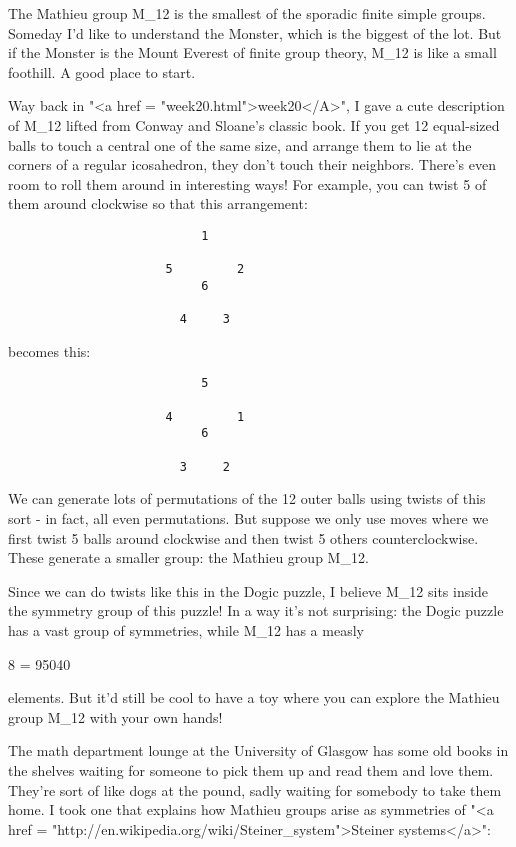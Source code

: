 The Mathieu group M_{12} is the smallest of the sporadic finite simple
groups.  Someday I'd like to understand the Monster, which is the 
biggest of the lot.  But if the Monster is the Mount Everest of finite 
group theory, M_{12} is like a small foothill.  A good place to start.

Way back in "<a href = "week20.html">week20</A>", I gave a
cute description of M_{12} lifted from Conway and Sloane's
classic book.  If you get 12 equal-sized balls to touch a central one
of the same size, and arrange them to lie at the corners of a regular
icosahedron, they don't touch their neighbors.  There's even room to
roll them around in interesting ways!  For example, you can twist 5 of
them around clockwise so that this arrangement:

\begin{verbatim}
                           1
 
                      5         2
                           6
                        
                        4     3
\end{verbatim}
    
becomes this: 

\begin{verbatim}
                           5
 
                      4         1
                           6
                        
                        3     2
\end{verbatim}
    
We can generate lots of permutations of the 12 outer balls using 
twists of this sort - in fact, all even permutations.  But suppose
we only use moves where we first twist 5 balls around clockwise and 
then twist 5 others counterclockwise.  These generate a smaller group: 
the Mathieu group M_{12}.

Since we can do twists like this in the Dogic puzzle, I believe
M_{12} sits inside the symmetry group of this puzzle!  In a
way it's not surprising: the Dogic puzzle has a vast group of
symmetries, while M_{12} has a measly

8     = 95040

elements.  But it'd still be cool to have a toy where you can explore 
the Mathieu group M_{12} with your own hands!

The math department lounge at the University of Glasgow has some old 
books in the shelves waiting for someone to pick them up and read them
and love them.  They're sort of like dogs at the pound, sadly waiting 
for somebody to take them home.  I took one that explains how Mathieu 
groups arise as symmetries of "<a href = "http://en.wikipedia.org/wiki/Steiner_system">Steiner systems</a>":


